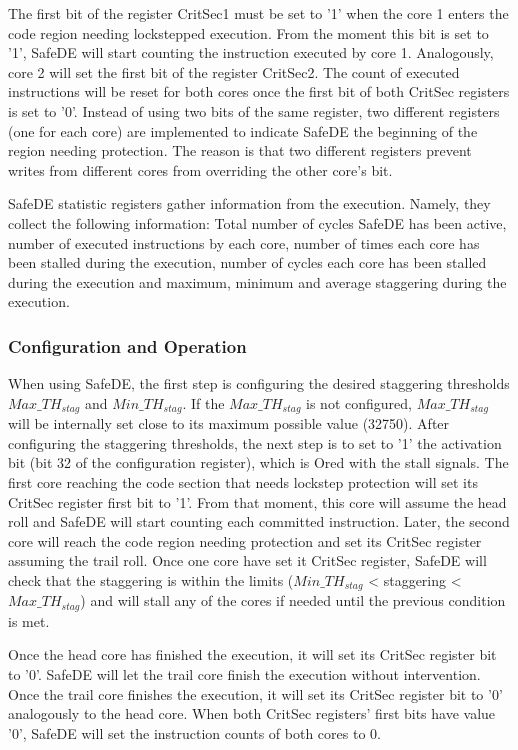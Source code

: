 The first bit of the register CritSec1 must be set to '1' when the core 1 enters the code region needing lockstepped execution. From the moment this bit is set to '1', SafeDE will start counting the instruction executed by core 1. Analogously, core 2 will set the first bit of the register CritSec2. The count of executed instructions will be reset for both cores once the first bit of both CritSec registers is set to '0'. Instead of using two bits of the same register, two different registers (one for each core) are implemented to indicate SafeDE the beginning of the region needing protection. The reason is that two different registers prevent writes from different cores from overriding the other core's bit.

SafeDE statistic registers gather information from the execution. Namely, they collect the following information: Total number of cycles SafeDE has been active, number of executed instructions by each core, number of times each core has been stalled during the execution, number of cycles each core has been stalled during the execution and maximum, minimum and average staggering during the execution.





\subsubsection{Configuration and Operation}

When using SafeDE, the first step is configuring the desired staggering thresholds $Max\_TH_{stag}$ and $Min\_TH_{stag}$. If the $Max\_TH_{stag}$ is not configured, $Max\_TH_{stag}$ will be internally set close to its maximum possible value (32750). After configuring the staggering thresholds, the next step is to set to '1' the activation bit (bit 32 of the configuration register), which is Ored with the stall signals. The first core reaching the code section that needs lockstep protection will set its CritSec register first bit to '1'. From that moment, this core will assume the head roll and SafeDE will start counting each committed instruction. Later, the second core will reach the code region needing protection and set its CritSec register assuming the trail roll. Once one core have set it CritSec register, SafeDE will check that the staggering is within the limits ($Min\_TH_{stag}$ < staggering < $Max\_TH_{stag}$) and will stall any of the cores if needed until the previous condition is met.  

Once the head core has finished the execution, it will set its CritSec register bit to '0'. SafeDE will let the trail core finish the execution without intervention. Once the trail core finishes the execution, it will set its CritSec register bit to '0' analogously to the head core. When both CritSec registers' first bits have value '0', SafeDE will set the instruction counts of both cores to 0.
\bigskip


